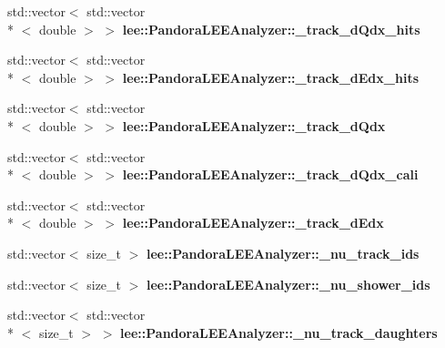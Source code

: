 \begin{DoxyCompactItemize}
\item 
\hypertarget{group__lee_ga4aa643d1912fe002773cb2bd1268f0f8}{std\-::vector$<$ std\-::vector\\*
$<$ double $>$ $>$ {\bfseries lee\-::\-Pandora\-L\-E\-E\-Analyzer\-::\-\_\-track\-\_\-d\-Qdx\-\_\-hits}}\label{group__lee_ga4aa643d1912fe002773cb2bd1268f0f8}

\item 
\hypertarget{group__lee_ga3ad01e55fc294c33fcff222f0efa2a1a}{std\-::vector$<$ std\-::vector\\*
$<$ double $>$ $>$ {\bfseries lee\-::\-Pandora\-L\-E\-E\-Analyzer\-::\-\_\-track\-\_\-d\-Edx\-\_\-hits}}\label{group__lee_ga3ad01e55fc294c33fcff222f0efa2a1a}

\item 
\hypertarget{group__lee_gab54b1be84b3a383b57e5b1c76b480d6b}{std\-::vector$<$ std\-::vector\\*
$<$ double $>$ $>$ {\bfseries lee\-::\-Pandora\-L\-E\-E\-Analyzer\-::\-\_\-track\-\_\-d\-Qdx}}\label{group__lee_gab54b1be84b3a383b57e5b1c76b480d6b}

\item 
\hypertarget{group__lee_gadcd255a2c652d64e4694c6b650839f43}{std\-::vector$<$ std\-::vector\\*
$<$ double $>$ $>$ {\bfseries lee\-::\-Pandora\-L\-E\-E\-Analyzer\-::\-\_\-track\-\_\-d\-Qdx\-\_\-cali}}\label{group__lee_gadcd255a2c652d64e4694c6b650839f43}

\item 
\hypertarget{group__lee_ga81034997677b254a8fa7fb9c090fa756}{std\-::vector$<$ std\-::vector\\*
$<$ double $>$ $>$ {\bfseries lee\-::\-Pandora\-L\-E\-E\-Analyzer\-::\-\_\-track\-\_\-d\-Edx}}\label{group__lee_ga81034997677b254a8fa7fb9c090fa756}

\item 
\hypertarget{group__lee_ga5253913419cf4211211558082106bd62}{std\-::vector$<$ size\-\_\-t $>$ {\bfseries lee\-::\-Pandora\-L\-E\-E\-Analyzer\-::\-\_\-nu\-\_\-track\-\_\-ids}}\label{group__lee_ga5253913419cf4211211558082106bd62}

\item 
\hypertarget{group__lee_ga063d4fec5b4b40b812147b1b77be79a3}{std\-::vector$<$ size\-\_\-t $>$ {\bfseries lee\-::\-Pandora\-L\-E\-E\-Analyzer\-::\-\_\-nu\-\_\-shower\-\_\-ids}}\label{group__lee_ga063d4fec5b4b40b812147b1b77be79a3}

\item 
\hypertarget{group__lee_gacb2657deb7fca8bcf8c97952d7a012cf}{std\-::vector$<$ std\-::vector\\*
$<$ size\-\_\-t $>$ $>$ {\bfseries lee\-::\-Pandora\-L\-E\-E\-Analyzer\-::\-\_\-nu\-\_\-track\-\_\-daughters}}\label{group__lee_gacb2657deb7fca8bcf8c97952d7a012cf}


\end{DoxyCompactItemize}
